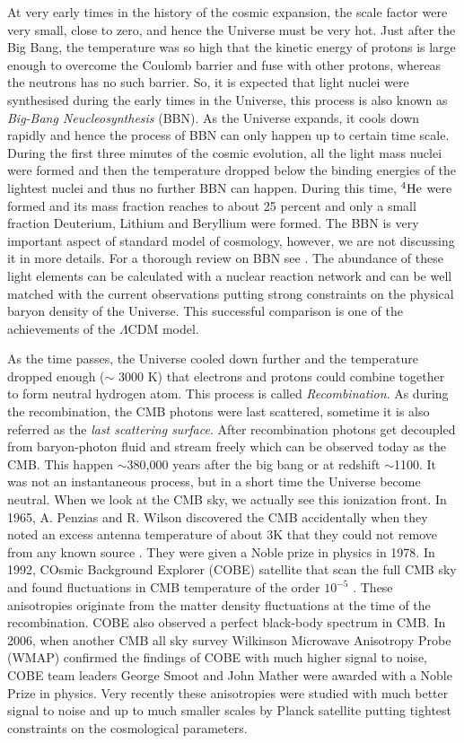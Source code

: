 At  very early times in the history of the cosmic expansion, the scale factor 
were very small, close to zero, and hence the Universe must be very hot. Just
after the Big Bang, the temperature was so high that the kinetic energy
of protons is large enough to overcome the Coulomb barrier and fuse with other
protons, whereas the neutrons has no such barrier. So, it is expected that
light nuclei were synthesised during the early times in the Universe, this
process is also known as {\it Big-Bang Neucleosynthesis} (BBN). 
As the Universe expands, 
it cools down rapidly and hence the process of BBN can only
happen up to certain time scale. During the first three minutes of the cosmic
evolution, all the light mass nuclei were formed and then the temperature
dropped below the binding energies of the lightest nuclei and thus no
further BBN can happen. During this time, $^4{\rm He}$ were formed and 
its mass fraction reaches to about 25 percent and only a small fraction 
Deuterium, Lithium and Beryllium were formed. 
The BBN is very important
aspect of standard model of cosmology, however, we are not discussing it in more
details. For a thorough review on BBN
see \cite{2000PhST...85...12T,2006astro.ph..1514F}. The abundance of these light elements 
can be calculated with a nuclear reaction network and can be well matched
with the current observations putting strong constraints on the physical
baryon density of the Universe. This successful comparison is one of the
achievements of the $\Lambda$CDM model.

As the time passes, the Universe cooled down further and the temperature
dropped enough ($\sim$ 3000 K) that electrons and protons could combine 
together to form neutral hydrogen
atom. This process is called {\it Recombination}. As during the recombination,
the CMB photons were last scattered, sometime it is also referred
as the {\it last scattering surface}. After recombination photons 
get decoupled from baryon-photon fluid and stream freely which
can be observed today as the CMB. 
This happen $\sim$380,000 years after the big bang or at redshift 
$\sim$1100. It was not an instantaneous process, but in a short time
the Universe become neutral. When we look at the CMB sky, we actually see
this ionization front. In 1965, A. Penzias and R. Wilson discovered the CMB
accidentally when they noted an excess antenna temperature of about 3K that
they could not remove from any known source \citep{2006astro.ph..1514F}. 
They were given a Noble prize in 
physics in 1978. In 1992, COsmic Background Explorer (COBE) satellite that
scan the full CMB sky and found fluctuations in CMB temperature of the 
order $10^{-5}$ \citep{1996ApJ...473..576F,1999AIPC..476....1S}. 
These anisotropies originate from the matter density
fluctuations at the time of the recombination. COBE also observed a perfect
black-body spectrum in CMB. In 2006, when another CMB all sky survey 
Wilkinson Microwave Anisotropy Probe (WMAP) \citep{2006PThPS.163..185K} 
confirmed the findings of COBE
with much higher signal to noise, COBE team leaders George Smoot and John Mather
were awarded with a Noble Prize in physics. Very recently these anisotropies were studied
with much better signal to noise and up to much smaller scales by Planck satellite
putting tightest constraints on the cosmological parameters.

